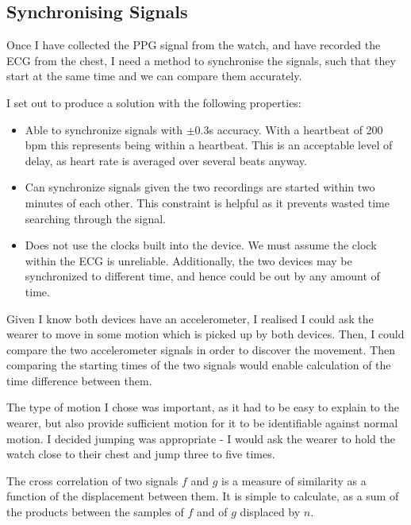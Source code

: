 \documentclass[12pt,a4paper,twoside,openright]{report}
\begin{document}
\subsection{Synchronising Signals} \label{section:sync}

Once I have collected the PPG signal from the watch, and have recorded the ECG
from the chest, I need a method to synchronise the signals, such that they
start at the same time and we can compare them accurately.

I set out to produce a solution with the following properties:
\begin{itemize}
	\item Able to synchronize signals with \(\pm0.3\)s accuracy. With a
		heartbeat of 200 bpm this represents being within a heartbeat.
		This is an acceptable level of delay, as heart rate is
		averaged over several beats anyway.

	\item Can synchronize signals given the two recordings are started
		within two minutes of each other. This constraint is helpful
		as it prevents wasted time searching through the signal.

	\item Does not use the clocks built into the device. We must assume
		the clock within the ECG is unreliable. Additionally, the two
		devices may be synchronized to different time, and hence could
		be out by any amount of time.
\end{itemize}

Given I know both devices have an accelerometer, I realised I could ask the
wearer to move in some motion which is picked up by both devices. Then, I
could compare the two accelerometer signals in order to discover the
movement. Then comparing the starting times of the two signals would enable
calculation of the time difference between them.

The type of motion I chose was important, as it had to be easy to explain to
the wearer, but also provide sufficient motion for it to be identifiable
against normal motion. I decided jumping was appropriate -
I would ask the wearer to hold the watch close to their chest and jump three
to five times.

The cross correlation of two signals \(f\) and \(g\) is a measure of
similarity as a function of the displacement between them. It is simple to
calculate, as a sum of the products between the samples of \(f\) and of \(g\)
displaced by \(n\).
\end{document}
